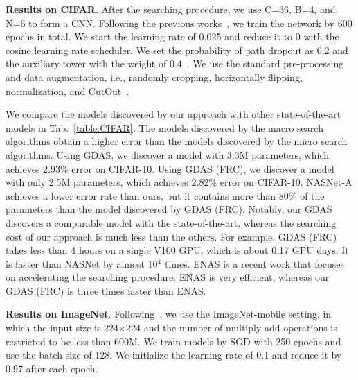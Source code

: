 \documentclass[10pt,twocolumn,letterpaper]{article}
\def\Tabref#1{Tab.~\ref{#1}}
\begin{document}
\textbf{Results on CIFAR}.
After the searching procedure, we use C=36, B=4, and N=6 to form a CNN.
Following the previous works~\cite{liu2019darts,pmlr-v80-pham18a,Zoph_2018_CVPR}, we train the network by 600 epochs in total. We start the learning rate of 0.025 and reduce it to 0 with the cosine learning rate scheduler.
We set the probability of path dropout as 0.2 and the auxiliary tower with the weight of 0.4~\cite{zoph2017NAS}.
We use the standard pre-processing and data augmentation, i.e., randomly cropping, horizontally flipping, normalization, and CutOut~\cite{CUTOUT,zhong2017random}.





We compare the models discovered by our approach with other state-of-the-art models in \Tabref{table:CIFAR}.
The models discovered by the macro search algorithms obtain a higher error than the models discovered by the micro search algorithms.
Using GDAS, we discover a model with 3.3M parameters, which achieves 2.93\% error on CIFAR-10.
Using GDAS (FRC), we discover a model with only 2.5M parameters, which achieves 2.82\% error on CIFAR-10.
NASNet-A achieves a lower error rate than ours, but it contains more than 80\% of the parameters than the model discovered by GDAS (FRC).
Notably, our GDAS discovers a comparable model with the state-of-the-art, whereas the searching cost of our approach is much less than the others.
For example, GDAS (FRC) takes less than 4 hours on a single V100 GPU, which is about 0.17 GPU days.
It is faster than NASNet by almost 10$^{4}$ times.
ENAS is a recent work that focuses on accelerating the searching procedure.
ENAS is very efficient, whereas our GDAS (FRC) is three times faster than ENAS.






\textbf{Results on ImageNet}.
Following~\cite{Zoph_2018_CVPR,liu2019darts,pmlr-v80-pham18a,sandler2018mobilenetv2}, we use the ImageNet-mobile setting, in which the input size is 224$\times$224 and the number of multiply-add operations is restricted to be less than 600M.
We train models by SGD with 250 epochs and use the batch size of 128.
We initialize the learning rate of 0.1 and reduce it by 0.97 after each epoch.
\end{document}
